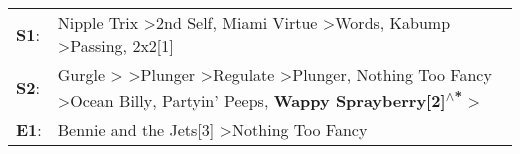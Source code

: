 \begin{supertabular}{p{0.03\textwidth}p{0.92\textwidth}}
 \textbf{S1}:  &                                                                                                                                                                                         Nipple Trix\textsuperscript{} \textgreater \enspace 2nd Self\textsuperscript{}, \enspace Miami Virtue\textsuperscript{} \textgreater \enspace Words\textsuperscript{}, \enspace Kabump\textsuperscript{} \textgreater \enspace Passing\textsuperscript{}, \enspace 2x2[1]\textsuperscript{}  \enspace  \\
 \textbf{S2}:  &  Gurgle\textsuperscript{} \textgreater {}\textsuperscript{} \textgreater \enspace Plunger\textsuperscript{} \textgreater \enspace Regulate\textsuperscript{} \textgreater \enspace Plunger\textsuperscript{}, \enspace Nothing Too Fancy\textsuperscript{} \textgreater \enspace Ocean Billy\textsuperscript{}, \enspace Partyin' Peeps\textsuperscript{}, \enspace \textbf{Wappy Sprayberry[2]\textsuperscript{$\wedge$*}} \textgreater {}\textsuperscript{}  \enspace  \\
 \textbf{E1}:  &                                                                                                                                                                                                                                                                                                                                                                                  Bennie and the Jets[3]\textsuperscript{} \textgreater \enspace Nothing Too Fancy\textsuperscript{}  \enspace  \\
\end{supertabular}
